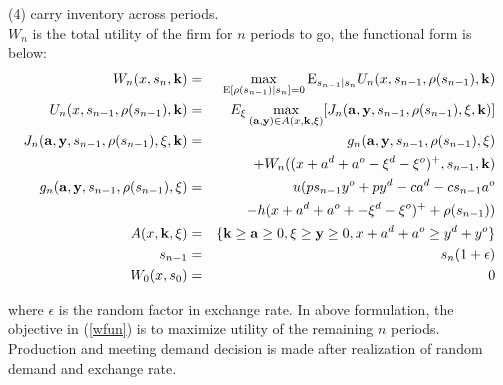 \documentclass[mnsc,nonblindrev,copyedit]{informs2_wz} %
\newcommand{\E}{\mathrm{E}}
\newcommand{\OUT}[1]{}
\begin{document}
{(4) carry inventory across periods.
\\
$W_n$ is the total utility of the firm for $n$ periods to go, the functional form is below:
\begin{eqnarray}
W_n( x,s_n, \bold k) &=& \max_{\E [\rho(s_{n-1})|s_n]=0}
\E_{s_{n-1}|s_n} U_n (x, s_{n-1}, \rho (s_{n-1}),\bold k) \label{wfun}\\
U_n(x,s_{n-1},\rho(s_{n-1}), \bold k )&=& E_{\bold
\xi}\max_{(\bold a, \bold y)
\in A (x,\bold {k, \xi})} [J_n (\bold {a,y}, s_{n-1},\rho(s_{n-1}),\bold{ \xi,k})]  \\
J_n (\bold{a,y},s_{n-1},\rho(s_{n-1}), \bold {\xi,k}) &=&
g_n(\bold{ a, y }, s_{n-1},\rho(s_{n-1}),\bold \xi) \nonumber \\&&
+ W_n((x+a^d+a^o-\xi^d-\xi^o)^+, s_{n-1}, \bold k)\label{vfun}
\\ g_n(\bold{ a, y}, s_{n-1},\rho(s_{n-1}),\bold \xi) &=& u(ps_{n-1} y^o + py^d-ca^d - cs_{n-1}a^o \nonumber \\ &&- h (x + a^d + a^o + - \xi^d-\xi^o)^+ + \rho(s_{n-1}) )\\
A(x,\bold{k,\xi}) &=& \{\bold k \geq \bold a \geq 0, \bold \xi \geq \bold y \geq 0, x+a^d + a^o \geq y^d + y^o\}\\
s_{n-1} &=& s_n(1 + \epsilon) \nonumber \\ W_0(x, s_0) &=& 0
\nonumber
\end{eqnarray}
\OUT{ \left\{
  \begin{array} {l}
  -c\min(k^d, \xi^d+\xi^o) - s_{n-1}c\min (k^o, (\xi^d+\xi^o -
  k^d)^+) + p\xi^d + s_{n-1} p \xi^o \\
   \quad \mbox{ if $s_{n-1}\geq 1 $  and $\xi^d + \xi^o \leq k^d + k^o$} \\
  -s_{n-1} c \min (k^o, \xi^d+\xi^o) - c \min (k^d, (\xi^o+\xi^d -
  k^o)^+) + p\xi^d + s_{n-1}p\xi^o \\
   \quad \mbox{if $s_{n-1}\leq 1 $  and $\xi^d + \xi^o \leq k^d + k^o$} \\
  -ck^d - cs_{n-1}k^o + ps_{n-1} \min(\xi^o, k^d + k^o) +
   p \min (\xi^d, (k^d + k^o-\xi^o)^+) \\
    \quad \mbox{if $s_{n-1}\geq 1 $  and $\xi^d + \xi^o \geq k^d + k^o$} \\
  -ck^d - cs_{n-1}k^o + p \min(\xi^d, k^d + k^o) +
   ps_{n-1} \min (\xi^o, (k^d + k^o-\xi^d)^+) \\
    \quad \mbox{if $s_{n-1}\leq 1 $  and $\xi^d + \xi^o \geq k^d + k^o$} \\
  \end{array} \right.       \label{gfun}
\\ s_{n-1} &=& s_n(1 + \epsilon), \nonumber \\ W_0(\bold x, s_0) &=& 0. \nonumber
\end{eqnarray}
}
where $\epsilon$ is the random factor in exchange rate.  In above formulation, the objective in (\ref{wfun}) is to maximize utility of the remaining $n$ periods.  Production and meeting demand decision is made after realization of random demand and exchange rate.

}
\end{document}
